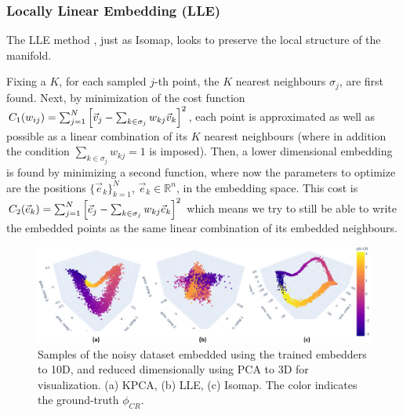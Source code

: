 \documentclass[11pt, a4paper, twoside]{article} %
\newcommand{\R}{\mathbb{R}} %
\DeclareRobustCommand{\mybox}[2][gray!10]{%
\begin{tcolorbox}[   %
        left=0.2cm,
        right=0.2cm,
        top=0.15cm,
        bottom=0.15cm,
        colback=#1,
        colframe=#1,
        width=\dimexpr\textwidth\relax, 
        enlarge left by=0mm,
        boxsep=5pt,
        arc=0pt,outer arc=0pt,
        ]
        #2
\end{tcolorbox}
}
\begin{document}
\subsubsection*{Locally Linear Embedding (LLE)}\vspace{-0.2cm}
The LLE method \cite{LLE}, just as Isomap, looks to preserve the local structure of the manifold.

\mybox{ Fixing a $K$, for each sampled $j$-th point, the $K$ nearest neighbours $\sigma_j$, are first found. Next, by minimization of the cost function $C_1(w_{ij})=\sum_{j=1}^N \qty[\vec{v}_j-\sum_{k\in\sigma_j}w_{kj}\vec{v}_k]^2$, each point is approximated as well as possible as a linear combination of its $K$ nearest neighbours (where in addition the condition $\sum_{k\in\sigma_j}w_{kj}=1$ is imposed). Then, a lower dimensional embedding is found by minimizing a second function, where now the parameters to optimize are the positions $\{\vec{e}_k\}_{k=1}^N$, $\vec{e}_k\in\R^n$, in the embedding space. This cost is $C_2(\vec{e}_k)=\sum_{j=1}^N \qty[\vec{e}_j-\sum_{k\in\sigma_j}w_{kj}\vec{e}_k]^2$ which means we try to still be able to write the embedded points as the same linear combination of its embedded neighbours.}
 
\begin{figure}[h!] 
     \centering 
    \includegraphics[width=0.96\linewidth]{emb2.PNG}
    \caption{ Samples of the noisy dataset embedded using the trained embedders to 10D, and reduced dimensionally using PCA to 3D for visualization. (a) KPCA, (b) LLE, (c) Isomap. The color indicates the ground-truth $\phi_{CR}$. }
    \label{fig:embeddings2}
\end{figure}
\end{document}

